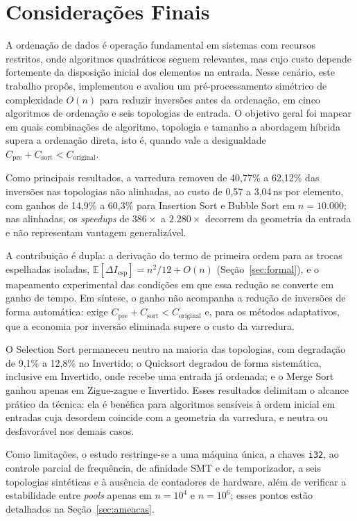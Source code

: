 \documentclass[12pt]{article}
\begin{document}
\section{Considerações Finais}\label{sec:fin}

A ordenação de dados é operação fundamental em sistemas com recursos restritos, onde algoritmos quadráticos seguem relevantes, mas cujo custo depende fortemente da disposição inicial dos elementos na entrada. Nesse cenário, este trabalho propôs, implementou e avaliou um pré-processamento simétrico de complexidade $O(n)$ para reduzir inversões antes da ordenação, em cinco algoritmos de ordenação e seis topologias de entrada. O objetivo geral foi mapear em quais combinações de algoritmo, topologia e tamanho a abordagem híbrida supera a ordenação direta, isto é, quando vale a desigualdade $C_{\text{pre}}+C_{\text{sort}}<C_{\text{original}}$.

Como principais resultados, a varredura removeu de 40,77\% a 62,12\% das inversões nas topologias não alinhadas, ao custo de 0,57 a 3,04\,ns por elemento, com ganhos de 14,9\% a 60,3\% para Insertion Sort e Bubble Sort em $n=10.000$; nas alinhadas, os \emph{speedups} de $386\times$ a $2.280\times$ decorrem da geometria da entrada e não representam vantagem generalizável.

A contribuição é dupla: a derivação do termo de primeira ordem para as trocas espelhadas isoladas, $\mathbb{E}[\Delta I_{\mathrm{esp}}]=n^2/12+O(n)$ (Seção~\ref{sec:formal}), e o mapeamento experimental das condições em que essa redução se converte em ganho de tempo. Em síntese, o ganho não acompanha a redução de inversões de forma automática: exige $C_{\text{pre}}+C_{\text{sort}}<C_{\text{original}}$ e, para os métodos adaptativos, que a economia por inversão eliminada supere o custo da varredura.

O Selection Sort permaneceu neutro na maioria das topologias, com degradação de 9,1\% a 12,8\% no Invertido; o Quicksort degradou de forma sistemática, inclusive em Invertido, onde recebe uma entrada já ordenada; e o Merge Sort ganhou apenas em Zigue-zague e Invertido. Esses resultados delimitam o alcance prático da técnica: ela é benéfica para algoritmos sensíveis à ordem inicial em entradas cuja desordem coincide com a geometria da varredura, e neutra ou desfavorável nos demais casos. 

Como limitações, o estudo restringe-se a uma máquina única, a chaves \texttt{i32}, ao controle parcial de frequência, de afinidade SMT e de temporizador, a seis topologias sintéticas e à ausência de contadores de hardware, além de verificar a estabilidade entre \emph{pools} apenas em $n{=}10^4$ e $n{=}10^6$; esses pontos estão detalhados na Seção~\ref{sec:ameacas}. 
\end{document}
